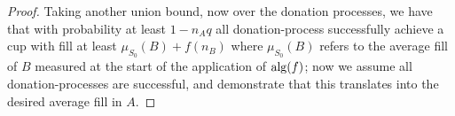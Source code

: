\begin{proof}

  Taking another union bound, now over the donation processes, we
  have that with probability at least $1-n_A q$ all
  donation-process successfully achieve a cup with fill at least
  $\mu_{S_0}(B) + f(n_B)$ where $\mu_{S_0}(B)$ refers to the
  average fill of $B$ measured at the start of the application of
  $\operatorname{\text{\textup{alg}}}(f)$; now we assume all donation-processes are successful,
  and demonstrate that this translates into the desired average
  fill in $A$.


\end{proof}
